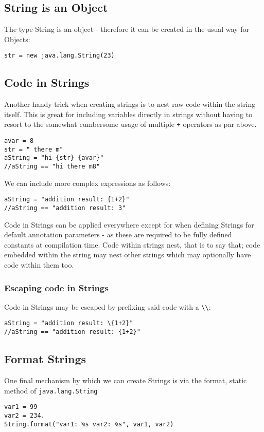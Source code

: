 \documentclass[conc-doc]{subfiles}
\begin{document}
\subsection{String is an Object}
The type String is an object - therefore it can be created in the usual way for Objects:
\begin{lstlisting}
str = new java.lang.String(23)
\end{lstlisting}

\subsection{Code in Strings}
Another handy trick when creating strings is to nest raw code within the string itself. This is great for including variables directly in strings without having to resort to the somewhat cumbersome usage of multiple \lstinline{+} operators as par above.

\begin{lstlisting}
avar = 8
str = " there m"
aString = "hi {str} {avar}"
//aString == "hi there m8"
\end{lstlisting}

We can include more complex expressions as follows:
\begin{lstlisting}
aString = "addition result: {1+2}"
//aString == "addition result: 3"
\end{lstlisting}

Code in Strings can be applied everywhere except for when defining Strings for default annotation parameters - as these are required to be fully defined constants at compilation time. Code within strings nest, that is to say that; code embedded within the string may nest other strings which may optionally have code within them too.

\subsubsection{Escaping code in Strings}
Code in Strings may be escaped by prefixing said code with a \lstinline{\\}:
\begin{lstlisting}
aString = "addition result: \{1+2}"
//aString == "addition result: {1+2}"
\end{lstlisting}

\subsection{Format Strings}
One final mechanism by which we can create Strings is via the format, static method of \lstinline{java.lang.String}
\begin{lstlisting}
var1 = 99
var2 = 234.
String.format("var1: %s var2: %s", var1, var2)
\end{lstlisting}
\end{document}
